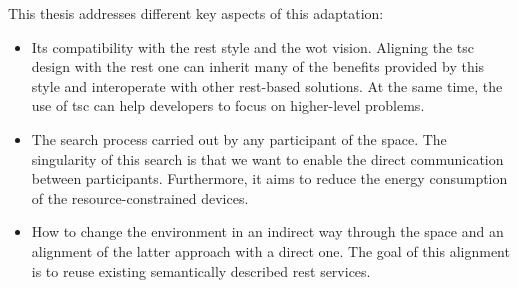 This thesis addresses different key aspects of this adaptation:
\begin{itemize}
  \item Its compatibility with the \acs{rest} style and the \ac{wot} vision.
	Aligning the \ac{tsc} design with the \ac{rest} one can inherit many of the benefits provided by this style and interoperate with other \ac{rest}-based solutions.
	At the same time, the use of \ac{tsc} can help developers to focus on higher-level problems.
  \item The search process carried out by any participant of the space.
	The singularity of this search is that we want to enable the direct communication between participants.
	Furthermore, it aims to reduce the energy consumption of the resource-constrained devices.
  \item How to change the environment in an indirect way through the space and an alignment of the latter approach with a direct one.
	The goal of this alignment is to reuse existing semantically described \ac{rest} services.
\end{itemize}
